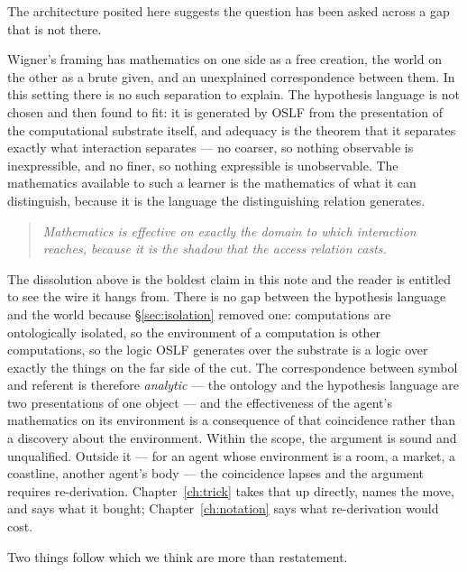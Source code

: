 The architecture posited here suggests the question has been asked across a gap that is not there.

Wigner's framing has mathematics on one side as a free creation, the world on the other as a brute
given, and an unexplained correspondence between them. In this setting there is no such separation to
explain. The hypothesis language is not chosen and then found to fit: it is generated by OSLF from the
presentation of the computational substrate itself, and adequacy is the theorem that it separates
exactly what interaction separates --- no coarser, so nothing observable is inexpressible, and no
finer, so nothing expressible is unobservable. The mathematics available to such a learner is the
mathematics of what it can distinguish, because it is the language the distinguishing relation
generates.

\begin{quote}
\itshape Mathematics is effective on exactly the domain to which interaction reaches, because it is
the shadow that the access relation casts.
\end{quote}

\begin{remark}
\label{sci:rem:wigner-scope}
The dissolution above is the boldest claim in this note and the reader is entitled to see the wire it hangs
from. There is no gap between the hypothesis language and the world because \S\ref{sec:isolation} removed
one: computations are ontologically isolated, so the environment of a computation is other computations,
so the logic OSLF generates over the substrate is a logic over exactly the things on the far side of the
cut. The correspondence between symbol and referent is therefore \emph{analytic} --- the ontology and the
hypothesis language are two presentations of one object --- and the effectiveness of the agent's
mathematics on its environment is a consequence of that coincidence rather than a discovery about the
environment. Within the scope, the argument is sound and unqualified. Outside it --- for an agent whose
environment is a room, a market, a coastline, another agent's body --- the coincidence lapses and the
argument requires re-derivation. Chapter~\ref{ch:trick} takes that up directly, names the move, and says
what it bought; Chapter~\ref{ch:notation} says what re-derivation would cost.
\end{remark}

Two things follow which we think are more than restatement.

